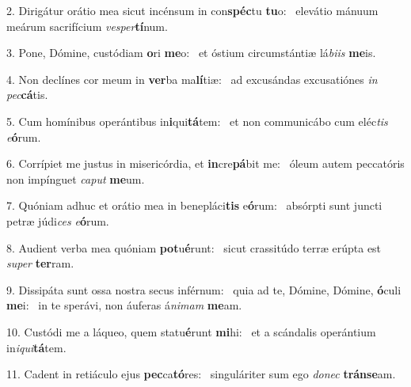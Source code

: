 2. Dirigátur orátio mea sicut incénsum in con\textbf{spéc}tu \textbf{tu}o: \ast\  elevátio mánuum meárum sacrifícium \textit{ves}\textit{per}\textbf{tí}num.\

3. Pone, Dómine, custódiam \textbf{o}ri \textbf{me}o: \ast\  et óstium circumstántiæ lá\textit{bi}\textit{is} \textbf{me}is.\

4. Non declínes cor meum in \textbf{ver}ba ma\textbf{lí}tiæ: \ast\  ad excusándas excusatiónes \textit{in} \textit{pec}\textbf{cá}tis.\

5. Cum homínibus operántibus in\textbf{i}qui\textbf{tá}tem: \ast\  et non communicábo cum eléc\textit{tis} \textit{e}\textbf{ó}rum.\

6. Corrípiet me justus in misericórdia, et \textbf{in}cre\textbf{pá}bit me: \ast\  óleum autem peccatóris non impínguet \textit{ca}\textit{put} \textbf{me}um.\

7. Quóniam adhuc et orátio mea in benepláci\textbf{tis} e\textbf{ó}rum: \ast\  absórpti sunt juncti petræ júdi\textit{ces} \textit{e}\textbf{ó}rum.\

8. Audient verba mea quóniam \textbf{pot}u\textbf{é}runt: \ast\  sicut crassitúdo terræ erúpta est \textit{su}\textit{per} \textbf{ter}ram.\

9. Dissipáta sunt ossa nostra secus inférnum: \dag\  quia ad te, Dómine, Dómine, \textbf{ó}culi \textbf{me}i: \ast\  in te sperávi, non áuferas á\textit{ni}\textit{mam} \textbf{me}am.\

10. Custódi me a láqueo, quem statu\textbf{é}runt \textbf{mi}hi: \ast\  et a scándalis operántium in\textit{i}\textit{qui}\textbf{tá}tem.\

11. Cadent in retiáculo ejus \textbf{pec}ca\textbf{tó}res: \ast\  singuláriter sum ego \textit{do}\textit{nec} \textbf{tráns}\textbf{e}am.\

